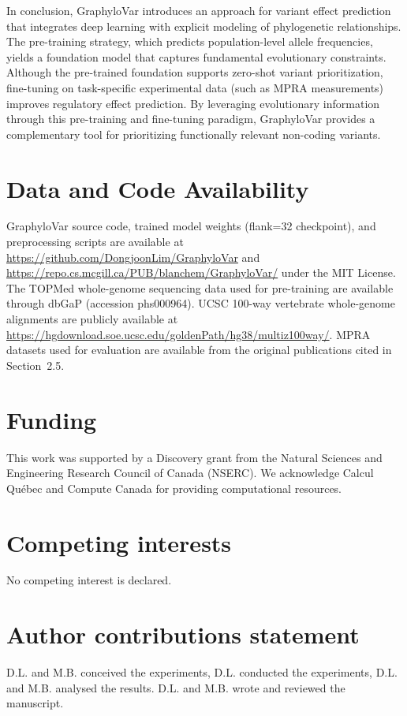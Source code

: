\documentclass[unnumsec,webpdf,contemporary,large]{oup-authoring-template}%
\theoremstyle{thmstyleone}%
\theoremstyle{thmstyletwo}%
\theoremstyle{thmstylethree}%
\begin{document}
In conclusion, GraphyloVar introduces an approach for variant effect prediction that integrates deep learning with explicit modeling of phylogenetic relationships. The pre-training strategy, which predicts population-level allele frequencies, yields a foundation model that captures fundamental evolutionary constraints. Although the pre-trained foundation supports zero-shot variant prioritization, fine-tuning on task-specific experimental data (such as MPRA measurements) improves regulatory effect prediction. By leveraging evolutionary information through this pre-training and fine-tuning paradigm, GraphyloVar provides a complementary tool for prioritizing functionally relevant non-coding variants.




\section{Data and Code Availability}
GraphyloVar source code, trained model weights (flank=32 checkpoint), and preprocessing scripts are available at \url{https://github.com/DongjoonLim/GraphyloVar} and \url{https://repo.cs.mcgill.ca/PUB/blanchem/GraphyloVar/} under the MIT License. The TOPMed whole-genome sequencing data used for pre-training are available through dbGaP (accession phs000964). UCSC 100-way vertebrate whole-genome alignments are publicly available at \url{https://hgdownload.soe.ucsc.edu/goldenPath/hg38/multiz100way/}. MPRA datasets used for evaluation are available from the original publications cited in Section~2.5.

\section{Funding}
This work was supported by a Discovery grant from the Natural Sciences and Engineering Research Council of Canada (NSERC). We acknowledge Calcul Qu\'ebec and Compute Canada for providing computational resources.

\section{Competing interests}
No competing interest is declared.

\section{Author contributions statement}

D.L. and M.B. conceived the experiments, D.L. conducted the experiments, D.L. and M.B. analysed the results. D.L. and M.B. wrote and reviewed the manuscript.
\end{document}
